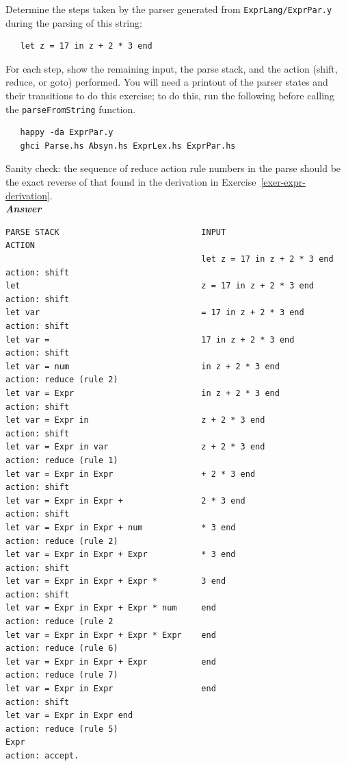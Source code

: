 \documentclass[a4paper]{article}
\begin{document}
\begin{exercise}\label{exer-expr-parse-steps}
  Determine the steps taken by the parser generated from
  \texttt{ExprLang/ExprPar.y} during the parsing of this string:

{\codesetup\begin{verbatim}
   let z = 17 in z + 2 * 3 end 
\end{verbatim}} 

\noindent 
For each step, show the remaining input, the parse stack, and the
action (shift, reduce, or goto) performed.  You will need a printout
of the parser states and their transitions to do this exercise; to do this, run
the following before calling the \texttt{parseFromString} function.

{\codesetup\begin{verbatim}
   happy -da ExprPar.y
   ghci Parse.hs Absyn.hs ExprLex.hs ExprPar.hs
\end{verbatim}} 

Sanity check: the
sequence of reduce action rule numbers in the parse should be the
exact reverse of that found in the derivation in
Exercise~\ref{exer-expr-derivation}.\\


\noindent
\textbf{\emph{Answer}} 

{\codesetup\begin{verbatim}
PARSE STACK                             INPUT                           ACTION
   	                                    let z = 17 in z + 2 * 3 end     action: shift
let	                                    z = 17 in z + 2 * 3 end         action: shift
let var                                 = 17 in z + 2 * 3 end           action: shift
let var =                               17 in z + 2 * 3 end             action: shift
let var = num                           in z + 2 * 3 end                action: reduce (rule 2)
let var = Expr                          in z + 2 * 3 end                action: shift
let var = Expr in                       z + 2 * 3 end                   action: shift
let var = Expr in var                   z + 2 * 3 end                   action: reduce (rule 1)
let var = Expr in Expr                  + 2 * 3 end                     action: shift
let var = Expr in Expr +                2 * 3 end                       action: shift
let var = Expr in Expr + num            * 3 end                         action: reduce (rule 2)
let var = Expr in Expr + Expr           * 3 end                         action: shift
let var = Expr in Expr + Expr *         3 end                           action: shift
let var = Expr in Expr + Expr * num     end                             action: reduce (rule 2
let var = Expr in Expr + Expr * Expr    end                             action: reduce (rule 6)
let var = Expr in Expr + Expr           end                             action: reduce (rule 7)
let var = Expr in Expr                  end                             action: shift
let var = Expr in Expr end 	                                            action: reduce (rule 5)
Expr                                                                    action: accept.
\end{verbatim}} 


\end{exercise}
\end{document}
